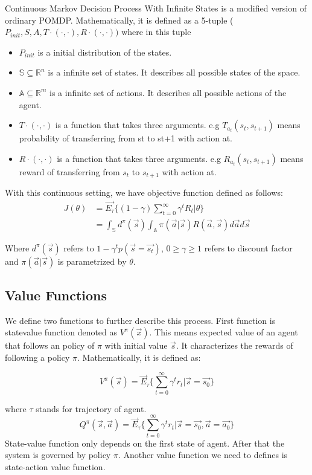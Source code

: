 \documentclass[officiallayout]{tktla}
\begin{document}
Continuous Markov Decision Process With Infinite States is a modified version of ordinary POMDP. Mathematically, it is defined as a 5-tuple ($P_{init},S,A,T\cdot(\cdot,\cdot),R\cdot(\cdot,\cdot))$ where in this tuple
\begin{itemize}
\item	$P_{init}$ is a initial distribution of the states.
\item	$\mathbb{S} \subseteq \mathbb{R}^n$ is a infinite set of states. It describes all possible states of the space.
\item	$\mathbb{A} \subseteq \mathbb{R}^m$ is a infinite set of actions. It describes all possible actions of the agent.
\item	$T\cdot(\cdot,\cdot)$ is a function that takes three arguments. e.g $T_{a_t}(s_t,s_{t+1})$ means probability of transferring from st to st+1 with action at.
\item	$R\cdot(\cdot,\cdot)$ is a function that takes three arguments. e.g $R_{a_t}(s_t,s_{t+1})$ means reward of transferring from $s_t$ to $s_{t+1}$ with action at.
\end{itemize}

With this continuous setting, we have objective function defined as follows:
\begin{align}
J(\theta) &= \vec{E_\tau}\{(1-\gamma)\sum_{t=0}^{\infty}\gamma^tR_t|\theta\} \\
&= \int_\mathbb{S}d^\pi(\vec{s})\int_\mathbb{A}\pi(\vec{a}|\vec{s})R(\vec{a}, \vec{s})d\vec{a}d\vec{s}
\end{align}


Where $d^\pi(\vec{s})$ refers to $1 - \gamma^tp(\vec{s} = \vec{s_t})$, $0 \geq \gamma \geq 1$ refers to discount factor and $\pi(\vec{a}|\vec{s})$ is parametrized by $\theta$.
\subsection{Value Functions}
We define two functions to further describe this process. First function is statevalue
function denoted as $V^\pi(\vec{x})$. This means expected value of an agent that follows
an policy of $\pi$ with initial value $\vec{s}$. It characterizes the rewards of following a policy $\pi$. Mathematically, it is defined as:

\begin{equation}
V^\pi(\vec{s}) = \vec{E}_\tau\{\sum_{t=0}^\infty\gamma^tr_t|\vec{s} = \vec{s_0}\}
\end{equation}

where $\tau$ stands for trajectory of agent.
\begin{equation}
Q^\pi(\vec{s}, \vec{a}) = \vec{E}_\tau\{\sum_{t=0}^\infty\gamma^tr_t|\vec{s} = \vec{s_0}, \vec{a} = \vec{a_0}\}
\end{equation}
State-value function only depends on the first state of agent. After that the system
is governed by policy $\pi$. Another value function we need to defines is state-action
value function.
\end{document}
